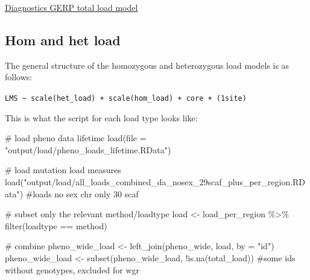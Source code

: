 \documentclass[
  letterpaper,
  DIV=11,
  numbers=noendperiod]{scrreprt}
\newenvironment{Shaded}{}{}
\newcommand{\AttributeTok}[1]{\textcolor[rgb]{0.84,0.23,0.29}{#1}}
\newcommand{\CommentTok}[1]{\textcolor[rgb]{0.42,0.45,0.49}{#1}}
\newcommand{\FunctionTok}[1]{\textcolor[rgb]{0.44,0.26,0.76}{#1}}
\newcommand{\NormalTok}[1]{\textcolor[rgb]{0.14,0.16,0.18}{#1}}
\newcommand{\OtherTok}[1]{\textcolor[rgb]{0.44,0.26,0.76}{#1}}
\newcommand{\SpecialCharTok}[1]{\textcolor[rgb]{0.00,0.36,0.77}{#1}}
\newcommand{\StringTok}[1]{\textcolor[rgb]{0.01,0.18,0.38}{#1}}
\begin{document}
\href{https://github.com/rshuhuachen/ms_load_grouse/blob/main/output/models/diagnosis/lms_total_gerp45.pdf}{Diagnostics
GERP total load model}

\hypertarget{hom-and-het-load}{%
\subsection{Hom and het load}\label{hom-and-het-load}}

The general structure of the homozygous and heterozygous load models is
as follows:

\texttt{LMS\ \textasciitilde{}\ scale(het\_load)\ +\ scale(hom\_load)\ +\ core\ +\ (1\textbar{}site)}

This is what the script for each load type looks like:

\begin{Shaded}
\begin{Highlighting}[]
\CommentTok{\# load pheno data lifetime}
\FunctionTok{load}\NormalTok{(}\AttributeTok{file =} \StringTok{"output/load/pheno\_loads\_lifetime.RData"}\NormalTok{)}

\CommentTok{\# load mutation load measures}
\FunctionTok{load}\NormalTok{(}\StringTok{"output/load/all\_loads\_combined\_da\_nosex\_29scaf\_plus\_per\_region.RData"}\NormalTok{) }\CommentTok{\#loads no sex chr only 30 scaf}

\CommentTok{\# subset only the relevant method/loadtype}
\NormalTok{load }\OtherTok{\textless{}{-}}\NormalTok{ load\_per\_region }\SpecialCharTok{\%\textgreater{}\%} \FunctionTok{filter}\NormalTok{(loadtype }\SpecialCharTok{==}\NormalTok{ method)}

\CommentTok{\# combine}
\NormalTok{pheno\_wide\_load }\OtherTok{\textless{}{-}} \FunctionTok{left\_join}\NormalTok{(pheno\_wide, load, }\AttributeTok{by =} \StringTok{"id"}\NormalTok{)}
\NormalTok{pheno\_wide\_load }\OtherTok{\textless{}{-}} \FunctionTok{subset}\NormalTok{(pheno\_wide\_load, }\SpecialCharTok{!}\FunctionTok{is.na}\NormalTok{(total\_load)) }\CommentTok{\#some ids without genotypes, excluded for wgr}


\end{Highlighting}
\end{Shaded}
\end{document}
